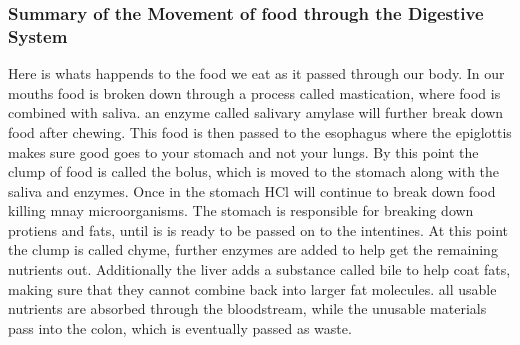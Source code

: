 \documentclass[letterpaper, 11pt]{article}
\begin{document}
\subsubsection{Summary of the Movement of food through the Digestive System}
\label{sec:orgfe9f7a5}
Here is whats happends to the food we eat as it passed through our body. In our mouths food is broken down through a process called mastication, where food is combined with saliva. an enzyme called salivary amylase will further break down food after chewing. This food is then passed to the esophagus where the epiglottis makes sure good goes to your stomach and not your lungs. By this point the clump of food is called the bolus, which is moved to the stomach along with the saliva and enzymes. Once in the stomach HCl will continue to break down food killing mnay microorganisms. The stomach is responsible for breaking down protiens and fats, until is is ready to be passed on to the intentines. At this point the clump is called chyme, further enzymes are added to help get the remaining nutrients out. Additionally the liver adds a substance called bile to help coat fats, making sure that they cannot combine back into larger fat molecules. all usable nutrients are absorbed through the bloodstream, while the unusable materials pass into the colon, which is eventually passed as waste.\\
\end{document}

